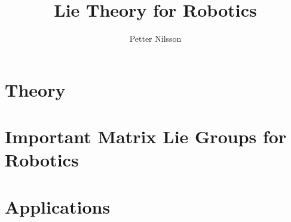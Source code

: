 \documentclass{scrbook}
\title{Lie Theory for Robotics}
\author{Petter Nilsson}
\begin{document}
\frontmatter

\maketitle

\tableofcontents

\mainmatter



\part{Theory}













\part{Important Matrix Lie Groups for Robotics}







\part{Applications}




















\backmatter

\printbibliography

% 

\end{document}
